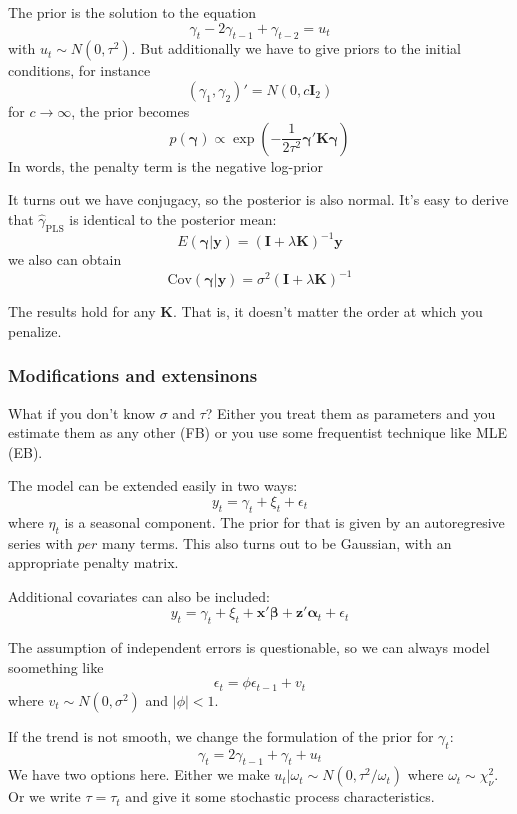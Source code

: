 \documentclass{article}
\begin{document}
    The prior is the solution to the equation 
    \[\gamma_t - 2 \gamma_{t-1} + \gamma_{t -2} = u_t\]
    with \(u_t \sim N(0, \tau^2)\). But additionally we have to give priors to the initial conditions, for instance 
    \[ (\gamma_1, \gamma_2)' = N(0, c\mathbf I_2) \]
    for \(c \rightarrow \infty\), the prior becomes 
    \[p(\boldsymbol\gamma) \propto \exp \left(-\frac{1}{2\tau^2}\boldsymbol\gamma'\mathbf K \boldsymbol\gamma \right)\]
    In words, the penalty term is the negative log-prior
    
    It turns out we have conjugacy, so the posterior is also normal. 
    It's easy to derive that \(\hat \gamma_{\text{PLS}}\) is identical to the posterior mean:
    \[E(\boldsymbol\gamma|\mathbf y) = (\mathbf I + \lambda \mathbf K)^{-1} \mathbf y \]
    we also can obtain 
    \[\text{Cov}(\boldsymbol \gamma|\mathbf y) = \sigma^2 (\mathbf I + \lambda\mathbf K)^{-1}\]
    
    The results hold for any \(\mathbf K\). That is, it doesn't matter the order at which you penalize. 

    \subsubsection{Modifications and extensinons}

    What if you don't know \(\sigma\) and \(\tau\)? Either you treat them as parameters and you estimate them as any other (FB) or you use some frequentist technique like MLE (EB).

    The model can be extended easily in two ways:
    \[ y_t  = \gamma_t + \xi_t + \epsilon_t \] 
    where \(\eta_t\) is a seasonal component. The prior for that is given by an autoregresive series with \(per\) many terms. This also turns out to be Gaussian, with an appropriate penalty matrix. 

    Additional covariates can also be included:
    \[y_t = \gamma_t + \xi_t + \mathbf x ' \boldsymbol\beta + \mathbf z ' \boldsymbol\alpha_t + \epsilon_t\]

    The assumption of independent errors is questionable, so we can always model soomething like 
    \[\epsilon_t = \phi \epsilon_{t -1} + v_t\]
    where \(v_t \sim N(0, \sigma^2)\) and \(|\phi| < 1\).

    If the trend is not smooth, we change the formulation of the prior for \(\gamma_t\):
    \[\gamma_t = 2\gamma_{t -1 }+\gamma_t +u_t\]
    We have two options here. Either we make \(u_t|\omega_t \sim N(0, \tau^2/\omega_t)\) where \(\omega_t\sim \chi^2_\nu\). Or we write \(\tau = \tau_t\) and give it some stochastic process characteristics. 
    
\end{document}
